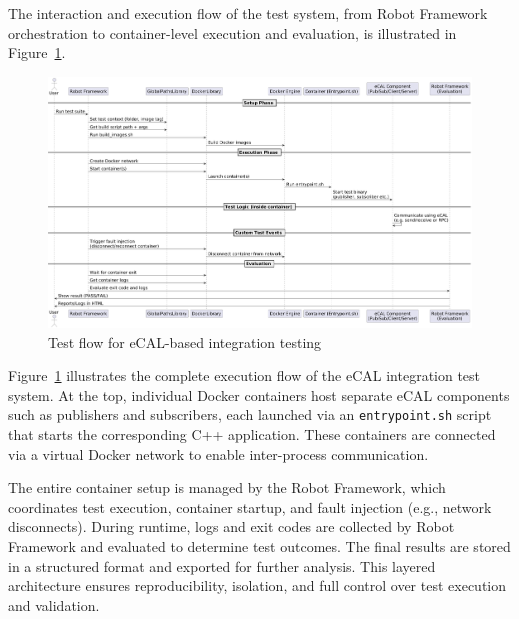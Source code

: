 \vspace{1em}
The interaction and execution flow of the test system, from Robot Framework orchestration to container-level execution and evaluation, is illustrated in Figure~\ref{fig:ecal_test_flow}.



\begin{landscape}
	\clearscrheadings
	\ofoot{}
	
	\begin{figure}[H]
		\centering
		\includegraphics[width=1.41\textwidth]{Images/ecal_test_flow.png}
		\caption{Test flow for eCAL-based integration testing}
		\label{fig:ecal_test_flow}
	\end{figure}
\end{landscape}

\clearpage
\pagestyle{scrheadings}


Figure~\ref{fig:ecal_test_flow} illustrates the complete execution flow of the eCAL integration test system. At the top, individual Docker containers host separate eCAL components such as publishers and subscribers, each launched via an \texttt{entrypoint.sh} script that starts the corresponding C++ application. These containers are connected via a virtual Docker network to enable inter-process communication.

\vspace{1em}
The entire container setup is managed by the Robot Framework, which coordinates test execution, container startup, and fault injection (e.g., network disconnects). During runtime, logs and exit codes are collected by Robot Framework and evaluated to determine test outcomes. The final results are stored in a structured format and exported for further analysis. This layered architecture ensures reproducibility, isolation, and full control over test execution and validation.

